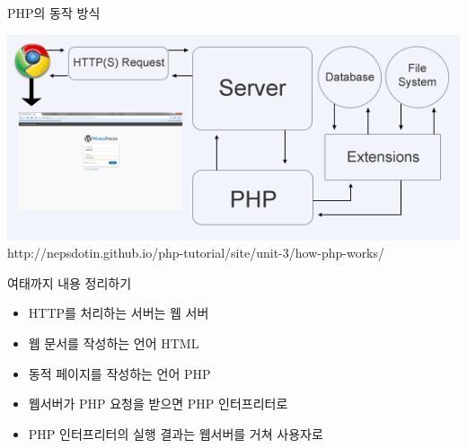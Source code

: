 \documentclass{beamer}
\begin{document}
    \begin{frame}{PHP의 동작 방식}
        \begin{center}
            \includegraphics[width=\textwidth]{Images/how-php-works.png}
            \tiny{http://nepsdotin.github.io/php-tutorial/site/unit-3/how-php-works/}
        \end{center}
        
    \end{frame}

    \begin{frame}{여태까지 내용 정리하기}
        \begin{itemize}
            \item HTTP를 처리하는 서버는 웹 서버
            \item 웹 문서를 작성하는 언어 HTML
            \item 동적 페이지를 작성하는 언어 PHP
            \item 웹서버가 PHP 요청을 받으면 PHP 인터프리터로
            \item PHP 인터프리터의 실행 결과는 웹서버를 거쳐 사용자로
        \end{itemize}
    \end{frame}
\end{document}
